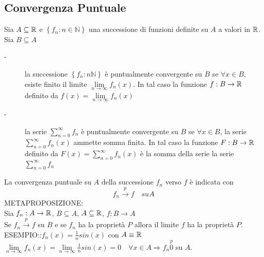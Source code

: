 \subsection{Convergenza Puntuale}
Sia $A\subseteq \mathbb{R}$ e $\left\{f_n:n\in\mathbb{N}\right\}$ una successione di funzioni definite su $A$ a valori in $ \mathbb{R}$. Sia $B\subseteq A$
\begin{description}
	\item[-] la successione $\left\{f_n:n\mathbb{N}\right\}$ è puntualmente convergente su $B$ se $\forall x \in B$, esiste finito il limite $\lim\limits_{n\to\infty}f_n(x)$. In tal caso la funzione $f:B\to  \mathbb{R}$ definito da $f(x)=\lim\limits_{n\to\infty}f_n(x)$
	\item[-] la serie $\sum\limits_{n=0}^{\infty}f_n$ è puntualmente convergente su $B$ se $\forall x \in B$, la serie $\sum\limits_{n=0}^{\infty}f_n(x)$ ammette somma finita. In tal caso la funzione $F:B\to  \mathbb{R}$ definito da $F(x)=\sum\limits_{n=0}^{\infty}f_n(x)$ è la somma della serie la serie $\sum\limits_{n=0}^{\infty}f_n$ 
\end{description}
\observation
La convergenza puntuale su $A$ della successione $f_n$ verso $f$ è indicata con
$$f_n\overset{p}{\to}f\quad su A$$
\proposition METAPROPOSIZIONE:\\
Sia $f_n:A\to \mathbb{R}$, $B\subseteq A$, $A\subseteq \mathbb{R}$, $f:B\to A$\\
Se $f_n\overset{p}{\to}f$ su $B$ e se $f_n$ ha la proprietà $P$ allora il limite $f$ ha la proprietà $P$.\\

ESEMPIO::$f_n(x)=\frac{1}{n}sin(x)$ con $A\equiv \mathbb{R}$\\
$\lim\limits_{n\to\infty}f_n(x)=\lim\limits_{n\to\infty}\frac{1}{n}sin(x)=0\quad\forall x \in A \Rightarrow f_n\overset{p}{0}$ su $A$.

